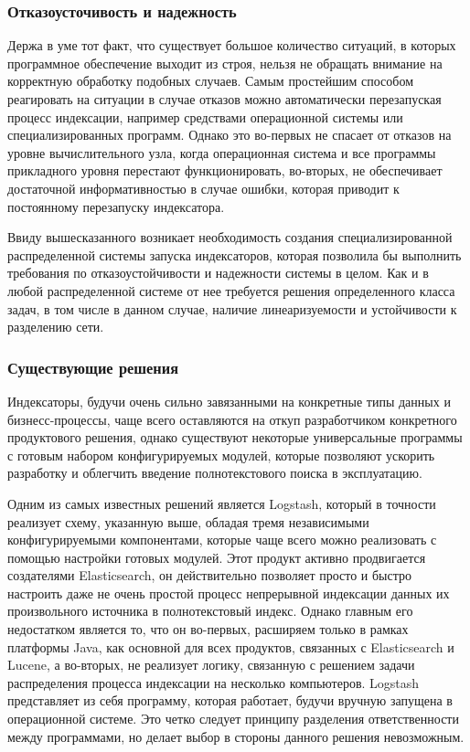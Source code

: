 \subsubsection{Отказоусточивость и надежность}

Держа в уме тот факт, что существует большое количество ситуаций, в которых программное обеспечение выходит из строя, нельзя не обращать внимание на корректную обработку подобных случаев. Самым простейшим способом реагировать на ситуации в случае отказов можно автоматически перезапуская процесс индексации, например средствами операционной системы или специализированных программ. Однако это во-первых не спасает от отказов на уровне вычислительного узла, когда операционная система и все программы прикладного уровня перестают функционировать, во-вторых, не обеспечивает достаточной информативностью в случае ошибки, которая приводит к постоянному перезапуску индексатора.

Ввиду вышесказанного возникает необходимость создания специализированной распределенной системы запуска индексаторов, которая позволила бы выполнить требования по отказоустойчивости и надежности системы в целом. Как и в любой распределенной системе от нее требуется решения определенного класса задач, в том числе в данном случае, наличие линеаризуемости и устойчивости к разделению сети.

\subsubsection{Существующие решения}

Индексаторы, будучи очень сильно завязанными на конкретные типы данных и бизнесс-процессы, чаще всего оставляются на откуп разработчиком конкретного продуктового решения, однако существуют некоторые универсальные программы с готовым набором конфигурируемых модулей, которые позволяют ускорить разработку и облегчить введение полнотекстового поиска в эксплуатацию.

Одним из самых известных решений является Logstash, который в точности реализует схему, указанную выше, обладая тремя независимыми конфигурируемыми компонентами, которые чаще всего можно реализовать с помощью настройки готовых модулей. Этот продукт активно продвигается создателями Elasticsearch, он действительно позволяет просто и быстро настроить даже не очень простой процесс непрерывной индексации данных их произвольного источника в полнотекстовый индекс. Однако главным его недостатком является то, что он во-первых, расширяем только в рамках платформы Java, как основной для всех продуктов, связанных с Elasticsearch и Lucene, а во-вторых, не реализует логику, связанную с решением задачи распределения процесса индексации на несколько компьютеров. Logstash представляет из себя программу, которая работает, будучи вручную запущена в операционной системе. Это четко следует принципу разделения ответственности между программами, но делает выбор в стороны данного решения невозможным.

